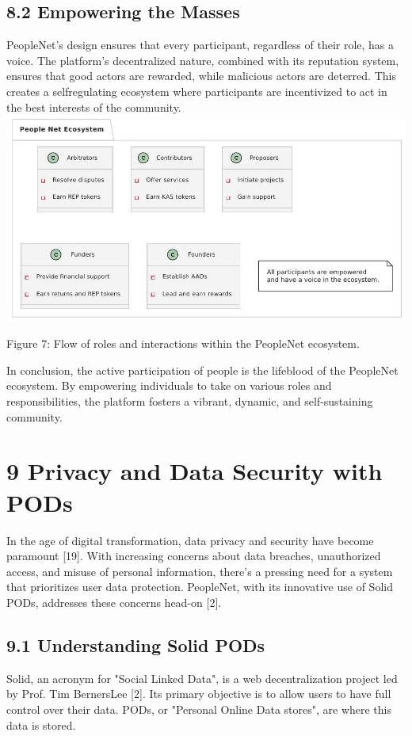 \documentclass[10pt]{article}
\begin{document}
\subsection*{8.2 Empowering the Masses}
PeopleNet's design ensures that every participant, regardless of their role, has a voice. The platform's decentralized nature, combined with its reputation system, ensures that good actors are rewarded, while malicious actors are deterred. This creates a selfregulating ecosystem where participants are incentivized to act in the best interests of the community.\\
\includegraphics[max width=\textwidth, center]{2025_03_06_545dea0014012947d15fg-08}

Figure 7: Flow of roles and interactions within the PeopleNet ecosystem.

In conclusion, the active participation of people is the lifeblood of the PeopleNet ecosystem. By empowering individuals to take on various roles and\\
responsibilities, the platform fosters a vibrant, dynamic, and self-sustaining community.

\section*{9 Privacy and Data Security with PODs}
In the age of digital transformation, data privacy and security have become paramount [19]. With increasing concerns about data breaches, unauthorized access, and misuse of personal information, there's a pressing need for a system that prioritizes user data protection. PeopleNet, with its innovative use of Solid PODs, addresses these concerns head-on [2].

\subsection*{9.1 Understanding Solid PODs}
Solid, an acronym for "Social Linked Data", is a web decentralization project led by Prof. Tim BernersLee [2]. Its primary objective is to allow users to have full control over their data. PODs, or "Personal Online Data stores", are where this data is stored.
\end{document}
